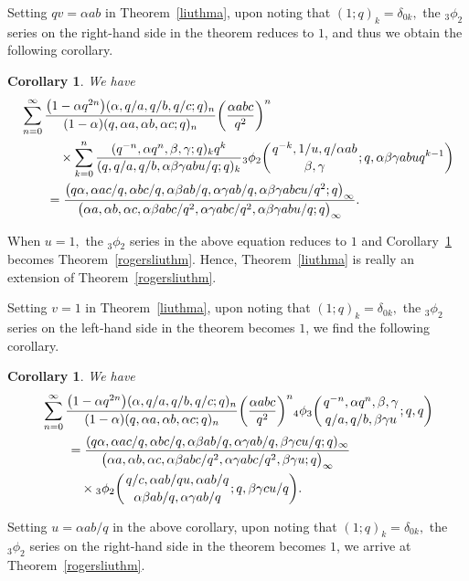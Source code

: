 \documentclass[pdftex]{sigma}
\numberwithin{equation}{section}
\newtheorem{Corollary}[Theorem]{Corollary}
\begin{document}
Setting $qv=\alpha ab$ in Theorem~\ref{liuthma}, upon noting that $(1; q)_k=\delta_{0k},$ the $_3\phi_2$ series on the right-hand side in the theorem reduces to $1$, and thus we obtain the following corollary.
\begin{Corollary}\label{liuthmb} We have
	\begin{align*}
		&\sum_{n=0}^\infty \frac{\bigl(1-\alpha q^{2n}\bigr)(\alpha, q/a, q/b, q/c; q)_n}{(1-\alpha)(q, \alpha a, \alpha b, \alpha c; q)_n}
		\biggl(\frac{\alpha abc}{q^2}\biggr)^n \\
		&\qquad\quad{} \times \sum_{k=0}^{n} \frac{(q^{-n}, \alpha q^n, \beta, \gamma; q)_k q^k}
		{(q, q/a, q/b, \alpha \beta \gamma ab u/q; q)_k}
		{_3\phi_2 \biggl({{q^{-k}, 1/u, q/\alpha ab}\atop{\beta, \gamma}}; q, \alpha \beta \gamma ab u q^{k-1}\biggr)}\\
		&\qquad{}=\frac{\bigl(q\alpha, \alpha ac/q, \alpha bc/q, \alpha \beta ab/q, \alpha \gamma ab/q, \alpha \beta \gamma abcu/q^2; q \bigr)_\infty}{\bigl(\alpha a, \alpha b, \alpha c, \alpha \beta abc/q^2, \alpha \gamma abc/q^2, \alpha \beta \gamma abu/q; q\bigr)_\infty}.
\end{align*}
\end{Corollary}
When $u=1, $ the ${_3}\phi{_2}$ series in the above equation reduces to $1$ and Corollary~\ref{liuthmb} becomes
Theorem~\ref{rogersliuthm}. Hence, Theorem~\ref{liuthma} is really an extension of Theorem~\ref{rogersliuthm}.

Setting $v=1$ in Theorem~\ref{liuthma}, upon noting that $(1; q)_k=\delta_{0k},$ the $_3\phi_2$ series
on the left-hand side in the theorem becomes $1$, we find the following corollary.

\begin{Corollary}\label{liuthmc} We have
	\begin{align*}
		&\sum_{n=0}^\infty \frac{\bigl(1-\alpha q^{2n}\bigr)(\alpha, q/a, q/b, q/c; q)_n}{(1-\alpha)(q, \alpha a, \alpha b, \alpha c; q)_n}\biggl(\frac{\alpha abc}{q^2}\biggr)^n {_4\phi_3}\biggl({{q^{-n}, \alpha q^n, \beta, \gamma}
			\atop{q/a, q/b, \beta \gamma u}}; q, q\biggr)\\
		&\qquad{}=\frac{(q\alpha, \alpha ac/q, \alpha bc/q, \alpha \beta ab/q, \alpha \gamma ab/q, \beta \gamma cu/q; q )_\infty}{\bigl(\alpha a, \alpha b, \alpha c, \alpha \beta abc/q^2, \alpha \gamma abc/q^2, \beta \gamma u; q \bigr)_\infty}\\
		&\qquad\quad{} \times{_3\phi_2} \biggl({{q/c, \alpha ab/qu, \alpha ab/q}\atop{\alpha \beta ab/q, \alpha \gamma ab/q}}; q, \beta \gamma cu/q \biggr).
	\end{align*}
\end{Corollary}
Setting $u=\alpha ab/q $ in the above corollary, upon noting that $(1; q)_k=\delta_{0k},$ the $_3\phi_2$ series
on the right-hand side in the theorem becomes $1$, we arrive at Theorem~\ref{rogersliuthm}.
\end{document}
